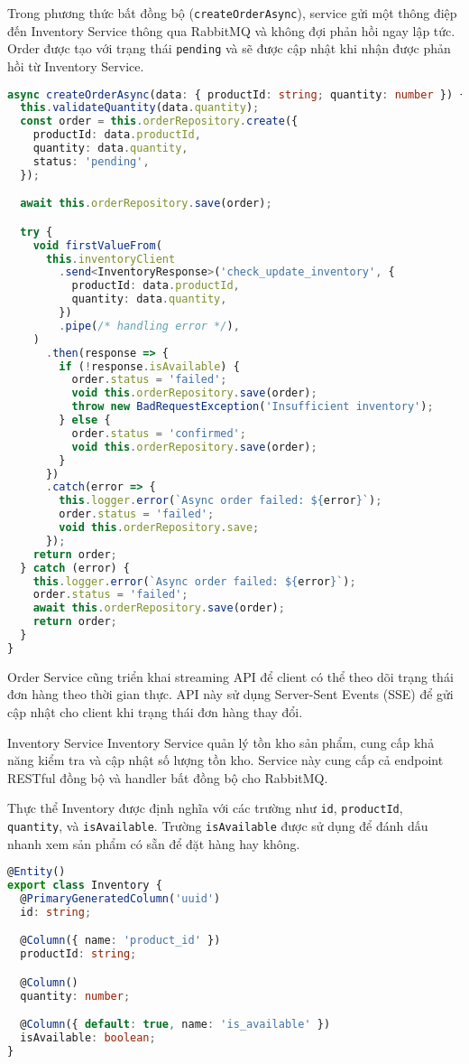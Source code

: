 Trong phương thức bất đồng bộ (\texttt{createOrderAsync}), service gửi một thông điệp đến Inventory Service thông qua RabbitMQ và không đợi phản hồi ngay lập tức. Order được tạo với trạng thái \texttt{pending} và sẽ được cập nhật khi nhận được phản hồi từ Inventory Service.

\begin{lstlisting}[language=Typescript]
async createOrderAsync(data: { productId: string; quantity: number }) {
  this.validateQuantity(data.quantity);
  const order = this.orderRepository.create({
    productId: data.productId,
    quantity: data.quantity,
    status: 'pending',
  });

  await this.orderRepository.save(order);

  try {
    void firstValueFrom(
      this.inventoryClient
        .send<InventoryResponse>('check_update_inventory', {
          productId: data.productId,
          quantity: data.quantity,
        })
        .pipe(/* handling error */),
    )
      .then(response => {
        if (!response.isAvailable) {
          order.status = 'failed';
          void this.orderRepository.save(order);
          throw new BadRequestException('Insufficient inventory');
        } else {
          order.status = 'confirmed';
          void this.orderRepository.save(order);
        }
      })
      .catch(error => {
        this.logger.error(`Async order failed: ${error}`);
        order.status = 'failed';
        void this.orderRepository.save;
      });
    return order;
  } catch (error) {
    this.logger.error(`Async order failed: ${error}`);
    order.status = 'failed';
    await this.orderRepository.save(order);
    return order;
  }
}
\end{lstlisting}

Order Service cũng triển khai streaming API để client có thể theo dõi trạng thái đơn hàng theo thời gian thực. API này sử dụng Server-Sent Events (SSE) để gửi cập nhật cho client khi trạng thái đơn hàng thay đổi.

Inventory Service
Inventory Service quản lý tồn kho sản phẩm, cung cấp khả năng kiểm tra và cập nhật số lượng tồn kho. Service này cung cấp cả endpoint RESTful đồng bộ và handler bất đồng bộ cho RabbitMQ.

Thực thể Inventory được định nghĩa với các trường như \texttt{id}, \texttt{productId}, \texttt{quantity}, và \texttt{isAvailable}. Trường \texttt{isAvailable} được sử dụng để đánh dấu nhanh xem sản phẩm có sẵn để đặt hàng hay không.

\begin{lstlisting}[language=Typescript]
@Entity()
export class Inventory {
  @PrimaryGeneratedColumn('uuid')
  id: string;

  @Column({ name: 'product_id' })
  productId: string;

  @Column()
  quantity: number;

  @Column({ default: true, name: 'is_available' })
  isAvailable: boolean;
}
\end{lstlisting}


